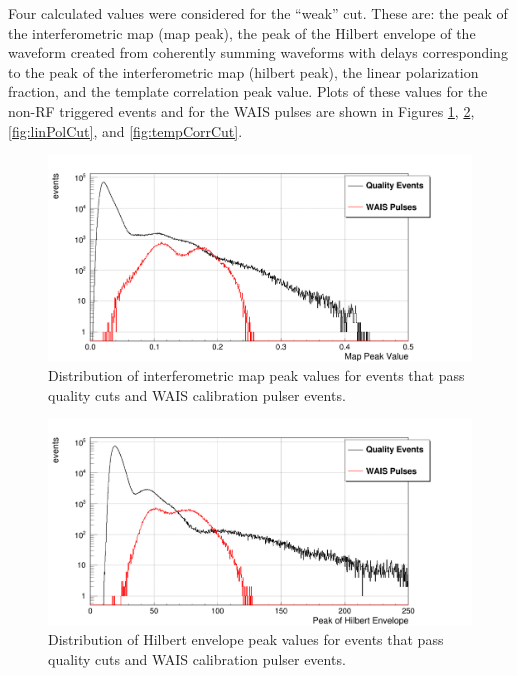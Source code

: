 	Four calculated values were considered for the ``weak'' cut.  These are: the peak of the interferometric map (map peak), the peak of the Hilbert envelope of the waveform created from coherently summing waveforms with delays corresponding to the peak of the interferometric map (hilbert peak), the linear polarization fraction, and the template correlation peak value.  Plots of these values for the non-RF triggered events and for the WAIS pulses are shown in Figures \ref{fig:mapPeakCut}, \ref{fig:hilbertCut}, \ref{fig:linPolCut}, and \ref{fig:tempCorrCut}.
	
	
\begin{figure}
	\centering
	\includegraphics[width=\textwidth]{figures/mapPeakCut}
	\caption{Distribution of interferometric map peak values for events that pass quality cuts and WAIS calibration pulser events.} 
	\label{fig:mapPeakCut}
\end{figure}
	
\begin{figure}
	\centering
	\includegraphics[width=\textwidth]{figures/hilbertCut}
	\caption{Distribution of Hilbert envelope peak values for events that pass quality cuts and WAIS calibration pulser events.} 
	\label{fig:hilbertCut}
\end{figure}

